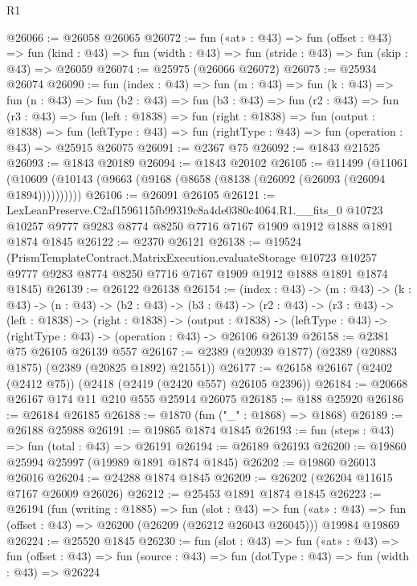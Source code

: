 \begin{lexlean}{R1}
\begin{coremodule}
@26066 := @26058 @26065
@26072 := fun («at» : @43) =>
  fun (offset : @43) =>
  fun (kind : @43) => fun (width : @43) => fun (stride : @43) => fun (skip : @43) => @26059
@26074 := @25975 (@26066 @26072)
@26075 := @25934 @26074
@26090 := fun (index : @43) =>
  fun (m : @43) =>
  fun (k : @43) =>
  fun (n : @43) =>
  fun (b2 : @43) =>
  fun (b3 : @43) =>
  fun (r2 : @43) =>
  fun (r3 : @43) =>
  fun (left : @1838) =>
  fun (right : @1838) =>
  fun (output : @1838) =>
  fun (leftType : @43) => fun (rightType : @43) => fun (operation : @43) => @25915 @26075
@26091 := @2367 @75
@26092 := @1843 @21525
@26093 := @1843 @20189
@26094 := @1843 @20102
@26105 := @11499
    (@11061 (@10609 (@10143 (@9663 (@9168 (@8658 (@8138 (@26092 (@26093 (@26094 @1894))))))))))
@26106 := @26091 @26105
@26121 := LexLeanPreserve.C2af1596115fb99319c8a4de0380c4064.R1.__fits_0
    @10723
    @10257
    @9777
    @9283
    @8774
    @8250
    @7716
    @7167
    @1909
    @1912
    @1888
    @1891
    @1874
    @1845
@26122 := @2370 @26121
@26138 := @19524
    (PrismTemplateContract.MatrixExecution.evaluateStorage
      @10723
      @10257
      @9777
      @9283
      @8774
      @8250
      @7716
      @7167
      @1909
      @1912
      @1888
      @1891
      @1874
      @1845)
@26139 := @26122 @26138
@26154 := (index : @43) ->
  (m : @43) ->
  (k : @43) ->
  (n : @43) ->
  (b2 : @43) ->
  (b3 : @43) ->
  (r2 : @43) ->
  (r3 : @43) ->
  (left : @1838) ->
  (right : @1838) ->
  (output : @1838) -> (leftType : @43) -> (rightType : @43) -> (operation : @43) -> @26106 @26139
@26158 := @2381 @75 @26105 @26139 @557
@26167 := @2389 (@20939 @1877) (@2389 (@20883 @1875) (@2389 (@20825 @1892) @21551))
@26177 := @26158 @26167 (@2402 (@2412 @75)) (@2418 (@2419 (@2420 @557) @26105 @2396))
@26184 := @20668 @26167 @174 @11 @210 @555 @25914 @26075
@26185 := @188 @25920
@26186 := @26184 @26185
@26188 := @1870 (fun ("_" : @1868) => @1868)
@26189 := @26188 @25988
@26191 := @19865 @1874 @1845
@26193 := fun (steps : @43) => fun (total : @43) => @26191
@26194 := @26189 @26193
@26200 := @19860 @25994 @25997 (@19989 @1891 @1874 @1845)
@26202 := @19860 @26013 @26016
@26204 := @24288 @1874 @1845
@26209 := @26202 (@26204 @11615 @7167 @26009 @26026)
@26212 := @25453 @1891 @1874 @1845
@26223 := @26194
    (fun (writing : @1885) =>
    fun (slot : @43) =>
    fun («at» : @43) => fun (offset : @43) => @26200 (@26209 (@26212 @26043 @26045)))
    @19984
    @19869
@26224 := @25520 @1845
@26230 := fun (slot : @43) =>
  fun («at» : @43) =>
  fun (offset : @43) => fun (source : @43) => fun (dotType : @43) => fun (width : @43) => @26224

\end{coremodule}
\end{lexlean}
